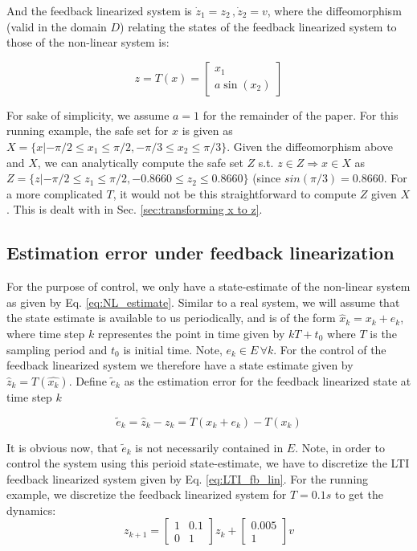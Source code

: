 And the feedback linearized system is $\dot{z}_1 = z_2\, ,\dot{z}_2 = v$, where the diffeomorphism (valid in the domain $D$) relating the states of the feedback linearized system to those of the non-linear system is:

\begin{equation}
z = T(x) = \begin{bmatrix} x_1 \\ a\sin(x_2) \end{bmatrix}
\end{equation}

For sake of simplicity, we assume $a=1$ for the remainder of the paper. For this running example, the safe set for $x$ is given as $X = \lbrace x| -\pi /2 \leq x_1 \leq \pi /2,-\pi /3 \leq x_2 \leq \pi/3 \rbrace$. Given the diffeomorphism above and $X$, we can analytically compute the safe set $Z$ s.t. $z \in Z \Rightarrow x \in X$ as $Z = \lbrace z| -\pi /2 \leq z_1 \leq \pi /2, -0.8660  \leq z_2 \leq 0.8660\rbrace$ (since $sin(\pi/3) = 0.8660$. For a more complicated $T$, it would not be this straightforward to compute $Z$ given $X$. This is dealt with in Sec. \ref{sec:transforming x to z}.

\subsection{Estimation error under feedback linearization}
\label{sec:EstErrFbLin}
For the purpose of control, we only have a state-estimate of the non-linear system as given by Eq. \ref{eq:NL_estimate}. Similar to a real system, we will assume that the state estimate is available to us periodically, and is of the form $\hat{x}_k = x_k + e_k$, where time step $k$ representes the point in time given by $kT+t_0$ where $T$ is the sampling period and $t_0$ is initial time. Note, $e_k \in E \, \forall k$. For the control of the feedback linearized system we therefore have a state estimate given by $\hat{z}_k = T(\hat{x_k})$. Define $\tilde{e}_k$ as the estimation error for the feedback linearized state at time step $k$

\begin{equation}
\label{eq:NLesterr}
\tilde{e}_k =\hat{z}_k - z_k =  T(x_k + e_k) - T(x_k)
\end{equation}

It is obvious now, that $\tilde{e}_k$ is not necessarily contained in  $E$. Note, in order to control the system using this perioid state-estimate, we have to discretize the LTI feedback linearized system given by Eq. \ref{eq:LTI_fb_lin}. For the running example, we discretize the feedback linearized system for $T=0.1s$ to get the dynamics:
\begin{equation}
\label{toy_dt}
z_{k+1} = \begin{bmatrix} 1 & 0.1 \\ 0 & 1 \end{bmatrix} z_k + \begin{bmatrix} 0.005 \\ 1 \end{bmatrix}v
\end{equation}

